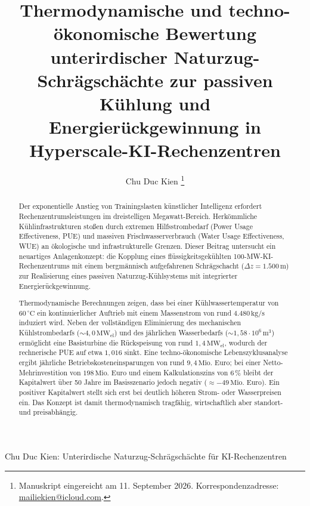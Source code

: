 \documentclass[journal]{IEEEtran}
\begin{document}
\title{Thermodynamische und techno-ökonomische Bewertung unterirdischer Naturzug-Schrägschächte zur passiven Kühlung und Energierückgewinnung in Hyperscale-KI-Rechenzentren}

\author{Chu Duc Kien
\thanks{Manuskript eingereicht am 11. September 2026. Korrespondenzadresse: \url{mailiekien@icloud.com}.}}

%
{Chu Duc Kien: Unterirdische Naturzug-Schrägschächte für KI-Rechenzentren}

\maketitle

\begin{abstract}
Der exponentielle Anstieg von Trainingslasten künstlicher Intelligenz erfordert Rechenzentrumsleistungen im dreistelligen Megawatt-Bereich. Herkömmliche Kühlinfrastrukturen stoßen durch extremen Hilfsstrombedarf (Power Usage Effectiveness, PUE) und massiven Frischwasserverbrauch (Water Usage Effectiveness, WUE) an ökologische und infrastrukturelle Grenzen. Dieser Beitrag untersucht ein neuartiges Anlagenkonzept: die Kopplung eines flüssigkeitsgekühlten 100-MW-KI-Rechenzentrums mit einem bergmännisch aufgefahrenen Schrägschacht ($\Delta z = 1.500\,\text{m}$) zur Realisierung eines passiven Naturzug-Kühlsystems mit integrierter Energierückgewinnung. 

Thermodynamische Berechnungen zeigen, dass bei einer Kühlwassertemperatur von $60\,^\circ\text{C}$ ein kontinuierlicher Auftrieb mit einem Massenstrom von rund $4.480\,\text{kg/s}$ induziert wird. Neben der vollständigen Eliminierung des mechanischen Kühlstrombedarfs ($\sim 4{,}0\,\text{MW}_{\text{el}}$) und des jährlichen Wasserbedarfs ($\sim 1{,}58 \cdot 10^6\,\text{m}^3$) ermöglicht eine Basisturbine die Rückspeisung von rund $1{,}4\,\text{MW}_{\text{el}}$, wodurch der rechnerische PUE auf etwa $1{,}016$ sinkt. Eine techno-ökonomische Lebenszyklusanalyse ergibt jährliche Betriebskosteneinsparungen von rund $9{,}4\,\text{Mio. Euro}$; bei einer Netto-Mehrinvestition von $198\,\text{Mio. Euro}$ und einem Kalkulationszins von $6\,\%$ bleibt der Kapitalwert über 50 Jahre im Basisszenario jedoch negativ ($\approx -49\,\text{Mio. Euro}$). Ein positiver Kapitalwert stellt sich erst bei deutlich höheren Strom- oder Wasserpreisen ein. Das Konzept ist damit thermodynamisch tragfähig, wirtschaftlich aber standort- und preisabhängig.
\end{abstract}
\end{document}
